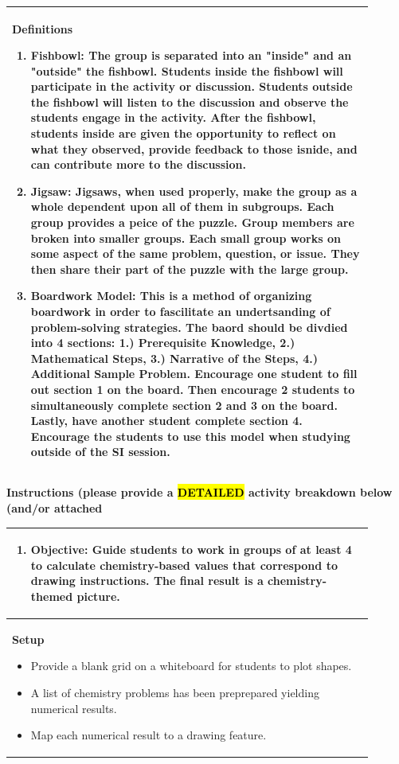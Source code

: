 \documentclass{article}
\begin{document}
{\vspace{0.5cm}
\noindent
\begin{tabular}{|p{0.9\linewidth}|}
\hline
{\large \textbf{Definitions}}
\begin{enumerate}
    \item \textbf{Fishbowl:} The group is separated into an "inside" and an "outside" the fishbowl. Students inside the fishbowl will participate in the activity or discussion. Students outside the fishbowl will listen to the discussion and observe the students engage in the activity. After the fishbowl, students inside are given the opportunity to reflect on what they observed, provide feedback to those isnide, and can contribute more to the discussion.
    \item \textbf{Jigsaw:} Jigsaws, when used properly, make the group as a whole dependent upon all of them in subgroups. Each group provides a peice of the puzzle. Group members are broken into smaller groups. Each small group works on some aspect of the same problem, question, or issue. They then share their part of the puzzle with the large group.
    \item \textbf{Boardwork Model:} This is a method of organizing boardwork in order to fascilitate an undertsanding of problem-solving strategies. The baord should be divdied into 4 sections: 1.) Prerequisite Knowledge, 2.) Mathematical Steps, 3.) Narrative of the Steps, 4.) Additional Sample Problem. Encourage one student to fill out section 1 on the board. Then encourage 2 students to simultaneously complete section 2 and 3 on the board. Lastly, have another student complete section 4. Encourage the students to use this model when studying outside of the SI session.
\end{enumerate}
\\ \hline
\end{tabular}
\item \vspace{0.2cm}
\newpage
{\large \textbf{Instructions (please provide a \hl{DETAILED} activity breakdown below (and/or attached}} \\
\begin{tabular}{|p{0.9\linewidth}|}
\hline
\begin{enumerate}
    \item \textbf{Objective:}  
    Guide students to work in groups of at least 4 to calculate chemistry-based values that correspond to drawing instructions.  
    The final result is a chemistry-themed picture.
\end{enumerate}
\\ \hline
\textbf{Setup}
\begin{itemize}
    \item Provide a blank grid on a whiteboard for students to plot shapes.
    \item A list of chemistry problems has been preprepared yielding numerical results.
    \item Map each numerical result to a drawing feature.
\end{itemize}


\end{tabular}}
\end{document}
